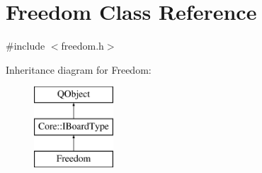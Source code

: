 \hypertarget{class_freedom}{\section{Freedom Class Reference}
\label{class_freedom}
}


{\ttfamily \#include $<$freedom.\-h$>$}

Inheritance diagram for Freedom\-:\begin{figure}[H]
\begin{center}
\leavevmode
\includegraphics[height=3.000000cm]{class_freedom}
\end{center}
\end{figure}

